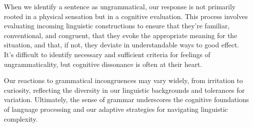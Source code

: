 


When we identify a sentence as ungrammatical, our response is not primarily rooted in a physical sensation but in a cognitive evaluation. This process involves evaluating incoming linguistic constructions to ensure that they're familiar, conventional, and congruent, that they evoke the appropriate meaning for the situation, and that, if not, they deviate in understandable ways to good effect. It's difficult to identify necessary and sufficient criteria for feelings of ungrammaticality, but cognitive dissonance is often at their heart.


Our reactions to grammatical incongruences may vary widely, from irritation to curiosity, reflecting the diversity in our linguistic backgrounds and tolerances for variation. Ultimately, the sense of grammar underscores the cognitive foundations of language processing and our adaptive strategies for navigating linguistic complexity.

